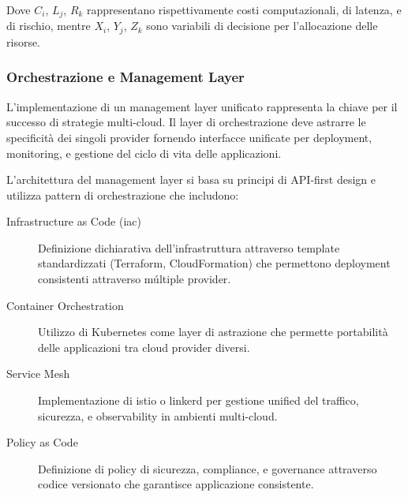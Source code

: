 Dove $C_i$, $L_j$, $R_k$ rappresentano rispettivamente costi computazionali, di latenza, e di rischio, mentre $X_i$, $Y_j$, $Z_k$ sono variabili di decisione per l'allocazione delle risorse.

\subsubsection{Orchestrazione e Management Layer}

L'implementazione di un management layer unificato rappresenta la chiave per il successo di strategie multi-cloud. Il layer di orchestrazione deve astrarre le specificità dei singoli provider fornendo interfacce unificate per deployment, monitoring, e gestione del ciclo di vita delle applicazioni.

L'architettura del management layer si basa su principi di API-first design e utilizza pattern di orchestrazione che includono:

\begin{description}
    \item[Infrastructure as Code (\gls{iac})] Definizione dichiarativa dell'infrastruttura attraverso template standardizzati (Terraform, CloudFormation) che permettono deployment consistenti attraverso múltiple provider.
    
    \item[Container Orchestration] Utilizzo di Kubernetes come layer di astrazione che permette portabilità delle applicazioni tra cloud provider diversi.
    
    \item[Service Mesh] Implementazione di istio o linkerd per gestione unified del traffico, sicurezza, e observability in ambienti multi-cloud.
    
    \item[Policy as Code] Definizione di policy di sicurezza, compliance, e governance attraverso codice versionato che garantisce applicazione consistente.
\end{description}


